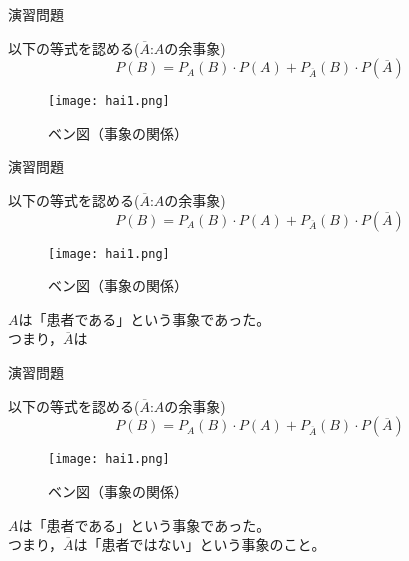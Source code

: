 \documentclass[aspectratio=169, dvipdfmx, 11pt]{beamer}
\begin{document}
\begin{frame}{演習問題}

\begin{block}{以下の等式を認める($\overline{A}$:$A$の余事象)}
	\begin{equation}
	P(B)=P_A(B)\cdot P(A)+P_{\overline{A}}(B)\cdot P(\overline{A})
	\end{equation}
\end{block}
\begin{figure}[H]
  \begin{center}
    \texttt{[image: hai1.png]}
    \caption{ベン図（事象の関係）}
    \label{fig:graph5}
  \end{center}
\end{figure}

\end{frame}


\begin{frame}{演習問題}

\begin{block}{以下の等式を認める($\overline{A}$:$A$の余事象)}
	\begin{equation}
	P(B)=P_A(B)\cdot P(A)+P_{\overline{A}}(B)\cdot P(\overline{A})
	\end{equation}
\end{block}
\begin{figure}[H]
  \begin{center}
    \texttt{[image: hai1.png]}
    \caption{ベン図（事象の関係）}
    \label{fig:graph5}
  \end{center}
\end{figure}

$A$は「患者である」という事象であった。\\
つまり，$\overline{A}$は
\end{frame}


\begin{frame}{演習問題}

\begin{block}{以下の等式を認める($\overline{A}$:$A$の余事象)}
	\begin{equation}
	P(B)=P_A(B)\cdot P(A)+P_{\overline{A}}(B)\cdot P(\overline{A})
	\end{equation}
\end{block}
\begin{figure}[H]
  \begin{center}
    \texttt{[image: hai1.png]}
    \caption{ベン図（事象の関係）}
    \label{fig:graph5}
  \end{center}
\end{figure}

$A$は「患者である」という事象であった。\\
つまり，$\overline{A}$は「患者ではない」という事象のこと。
\end{frame}
\end{document}
